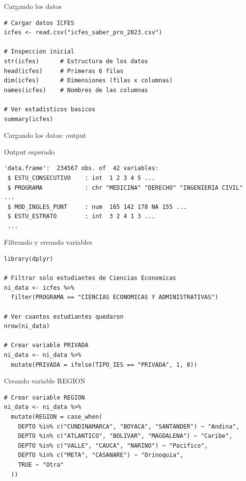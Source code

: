 \documentclass[aspectratio=169, 11pt]{beamer}
\begin{document}
\begin{frame}[fragile]{Cargando los datos}
\begin{lstlisting}
# Cargar datos ICFES
icfes <- read.csv("icfes_saber_pro_2023.csv")

# Inspeccion inicial
str(icfes)      # Estructura de los datos
head(icfes)     # Primeras 6 filas
dim(icfes)      # Dimensiones (filas x columnas)
names(icfes)    # Nombres de las columnas

# Ver estadisticos basicos
summary(icfes)
\end{lstlisting}
\end{frame}

\begin{frame}[fragile]{Cargando los datos: output}
\begin{exampleblock}{Output esperado}
\small
\begin{verbatim}
'data.frame':  234567 obs. of  42 variables:
 $ ESTU_CONSECUTIVO    : int  1 2 3 4 5 ...
 $ PROGRAMA            : chr "MEDICINA" "DERECHO" "INGENIERIA CIVIL" ...
 $ MOD_INGLES_PUNT     : num  165 142 178 NA 155 ...
 $ ESTU_ESTRATO        : int  3 2 4 1 3 ...
 ...
\end{verbatim}
\end{exampleblock}
\end{frame}

\begin{frame}[fragile]{Filtrando y creando variables}
\begin{lstlisting}
library(dplyr)

# Filtrar solo estudiantes de Ciencias Economicas
ni_data <- icfes %>%
  filter(PROGRAMA == "CIENCIAS ECONOMICAS Y ADMINISTRATIVAS")

# Ver cuantos estudiantes quedaron
nrow(ni_data)

# Crear variable PRIVADA
ni_data <- ni_data %>%
  mutate(PRIVADA = ifelse(TIPO_IES == "PRIVADA", 1, 0))
\end{lstlisting}
\end{frame}

\begin{frame}[fragile]{Creando variable REGION}
\begin{lstlisting}
# Crear variable REGION
ni_data <- ni_data %>%
  mutate(REGION = case_when(
    DEPTO %in% c("CUNDINAMARCA", "BOYACA", "SANTANDER") ~ "Andina",
    DEPTO %in% c("ATLANTICO", "BOLIVAR", "MAGDALENA") ~ "Caribe",
    DEPTO %in% c("VALLE", "CAUCA", "NARINO") ~ "Pacifico",
    DEPTO %in% c("META", "CASANARE") ~ "Orinoquia",
    TRUE ~ "Otra"
  ))
\end{lstlisting}
\end{frame}
\end{document}
